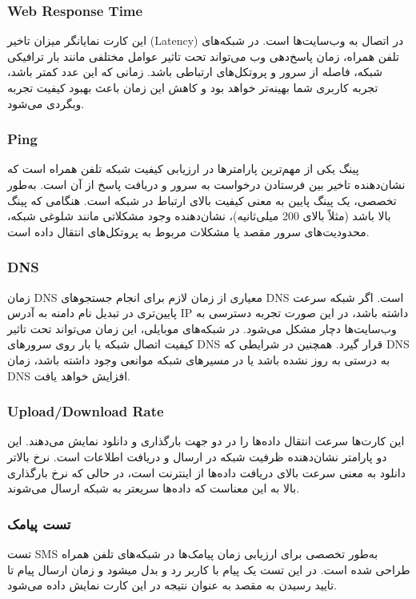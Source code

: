 \documentclass{report}
\begin{document}
\subsubsection{Web Response Time}
این کارت نمایانگر میزان تاخیر (Latency) در اتصال به وب‌سایت‌ها است. در شبکه‌های تلفن همراه، زمان پاسخ‌دهی وب می‌تواند تحت تاثیر عوامل مختلفی مانند بار ترافیکی شبکه، فاصله از سرور و پروتکل‌های ارتباطی باشد. زمانی که این عدد کمتر باشد، تجربه کاربری شما بهینه‌تر خواهد بود و کاهش این زمان باعث بهبود کیفیت تجربه وبگردی می‌شود.

\subsubsection{Ping}
پینگ یکی از مهم‌ترین پارامترها در ارزیابی کیفیت شبکه تلفن همراه است که نشان‌دهنده تاخیر بین فرستادن درخواست به سرور و دریافت پاسخ از آن است. به‌طور تخصصی، یک پینگ پایین به معنی کیفیت بالای ارتباط در شبکه است. هنگامی که پینگ بالا باشد (مثلاً بالای 200 میلی‌ثانیه)، نشان‌دهنده وجود مشکلاتی مانند شلوغی شبکه، محدودیت‌های سرور مقصد یا مشکلات مربوط به پروتکل‌های انتقال داده است.

\subsubsection{DNS}
زمان DNS معیاری از زمان لازم برای انجام جستجوهای DNS است. اگر شبکه سرعت پایین‌تری در تبدیل نام دامنه به آدرس IP داشته باشد، در این صورت تجربه دسترسی به وب‌سایت‌ها دچار مشکل می‌شود. در شبکه‌های موبایلی، این زمان می‌تواند تحت تاثیر کیفیت اتصال شبکه یا بار روی سرورهای DNS قرار گیرد. همچنین در شرایطی که DNS به درستی به روز نشده باشد یا در مسیرهای شبکه موانعی وجود داشته باشد، زمان DNS افزایش خواهد یافت.

\subsubsection{Upload/Download Rate}
این کارت‌ها سرعت انتقال داده‌ها را در دو جهت بارگذاری و دانلود نمایش می‌دهند. این دو پارامتر نشان‌دهنده ظرفیت شبکه در ارسال و دریافت اطلاعات است. نرخ بالاتر دانلود به معنی سرعت بالای دریافت داده‌ها از اینترنت است، در حالی که نرخ بارگذاری بالا به این معناست که داده‌ها سریعتر به شبکه ارسال می‌شوند.

\subsubsection{تست پیامک}
تست SMS به‌طور تخصصی برای ارزیابی زمان پیامک‌ها در شبکه‌های تلفن همراه طراحی شده است. در این تست یک پیام با کاربر رد و بدل میشود و زمان ارسال پیام تا تایید رسیدن به مقصد به عنوان نتیجه در این کارت نمایش داده می‌شود.
\end{document}

